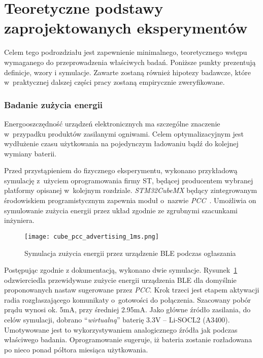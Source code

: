 \section{Teoretyczne podstawy zaprojektowanych eksperymentów}

Celem tego podrozdziału jest zapewnienie minimalnego, teoretycznego wstępu
wymaganego do przeprowadzenia właściwych badań. Poniższe punkty
prezentują definicje, wzory i symulacje. Zawarte zostaną również
hipotezy badawcze, które w~praktycznej dalszej części pracy
zostaną empirycznie zweryfikowane.

\subsubsection{Badanie zużycia energii}
Energooszczędność urządzeń elektronicznych ma szczególne znaczenie w~przypadku produktów
zasilanymi ogniwami. Celem optymalizacyjnym jest wydłużenie czasu użytkowania na pojedynczym
ładowaniu bądź do kolejnej wymiany baterii.

Przed przystąpieniem do fizycznego eksperymentu, wykonano przykładową symulację z~użyciem
oprogramowania firmy ST, będącej producentem wybranej platformy opisanej w~kolejnym rozdziale.
\textit{STM32CubeMX} będący zintegrowanym środowiskiem programistycznym zapewnia moduł
o~nazwie \textit{PCC}~\cite{noauthor_um1718_2022}. Umożliwia on symulowanie zużycia energii 
przez układ zgodnie ze zgrubnymi szacunkami inżyniera.

\begin{figure}[!ht]
	\centering \texttt{[image: cube\_pcc\_advertising\_1ms.png]} 
	\caption{Symulacja zużycia energii przez urządzenie \gls{BLE} podczas ogłaszania}
	\label{rys:cube_pcc_advertising_1ms}
\end{figure}

Postępując zgodnie z dokumentacją, wykonano dwie symulacje. Rysunek~\ref{rys:cube_pcc_advertising_1ms}
odzwierciedla przewidywane zużycie energii urządzenia BLE dla domyślnie proponowanych nastaw sugerowane przez \textit{PCC}.
Krok trzeci jest etapem aktywacji radia rozgłaszającego komunikaty o~gotowości do połączenia. Szacowany
pobór prądu wynosi ok. 5mA, przy średniej 2.95mA. Jako główne źródło zasilania, do celów
symulacji, dobrano \enquote{\textit{wirtualną}} baterię 3.3V -- Li-SOCL2 (A3400). Umotywowane jest to wykorzystywaniem analogicznego źródła
jak podczas właściwego badania. Oprogramowanie sugeruje, iż bateria zostanie rozładowana po nieco ponad półtora
miesiąca użytkowania.


